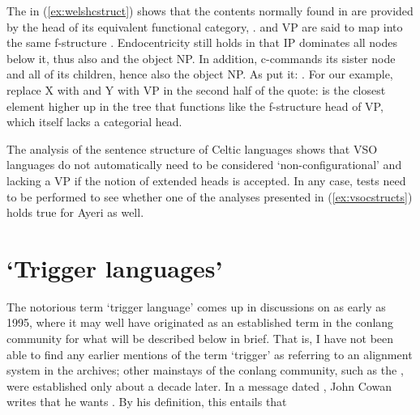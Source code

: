The \Avm{} in (\ref{ex:welshcstruct}) shows that the contents normally found in
 are provided by the head of its equivalent functional category,
.  and VP are said to map into the same f-structure \citep
[136]{bresnan2016}. Endocentricity still holds in that IP dominates all nodes
below it, thus also  and the object NP. In addition, 
c-commands its sister node and all of its children, hence also the object NP.
As \citet{bresnan2016} put it: . For our example, replace X with
 and Y with VP in the second half of the quote:  is the
closest element higher up in the tree that functions like the f-structure head
of VP, which itself lacks a categorial head.

The analysis of the sentence structure of Celtic languages shows that VSO
languages do not automatically need to be considered `non-configurational' and
lacking a VP if the notion of extended heads is accepted. In any case, tests
need to be performed to see whether one of the analyses presented in
(\ref{ex:vsocstructs}) holds true for Ayeri as well.

\section[‘Trigger languages’]{`Trigger languages'}

The notorious term `trigger language' comes up in discussions on
 as early as 1995, where it may well have originated as an
established term in the conlang community for what will be described below in
brief.
That is, I have not been able to find any earlier mentions of the term
`trigger' as referring to an alignment system in the archives; other mainstays
of the conlang community, such as the , were established only
about a decade later. In a message dated , John Cowan
writes that he wants . By his definition,
this entails that

